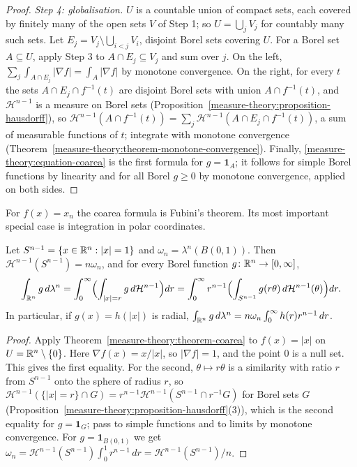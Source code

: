 \begin{proof}
\emph{Step 4: globalisation.} $U$ is a countable union of compact sets, each covered by finitely many of the open sets $V$ of Step 1; so $U = \bigcup_jV_j$ for countably many such sets. Let
$E_j = V_j \setminus \bigcup_{i < j}V_i$, disjoint Borel sets covering $U$. For a Borel set $A \subseteq U$, apply Step 3 to $A \cap E_j \subseteq V_j$ and sum over $j$. On the left,
$\sum_j\int_{A \cap E_j}|\nabla f| = \int_A|\nabla f|$ by monotone convergence. On the right, for every $t$ the sets $A \cap E_j \cap f^{-1}(t)$ are disjoint Borel sets with union
$A \cap f^{-1}(t)$, and $\mathcal{H}^{n-1}$ is a measure on Borel sets (Proposition~\ref{measure-theory:proposition-hausdorff}), so
$\mathcal{H}^{n-1}(A \cap f^{-1}(t)) = \sum_j\mathcal{H}^{n-1}(A \cap E_j \cap f^{-1}(t))$, a sum of measurable functions of $t$; integrate with monotone convergence
(Theorem~\ref{measure-theory:theorem-monotone-convergence}). Finally, \eqref{measure-theory:equation-coarea} is the first formula for $g = \mathbf{1}_A$; it follows for simple Borel functions by
linearity and for all Borel $g \geq 0$ by monotone convergence, applied on both sides.
\end{proof}

For $f(x) = x_n$ the coarea formula is Fubini's theorem. Its most important special case is integration in polar coordinates.

\begin{corollary}\label{measure-theory:corollary-polar}
Let $S^{n-1} = \{x \in \mathbb{R}^n : |x| = 1\}$ and $\omega_n = \lambda^n(B(0, 1))$. Then $\mathcal{H}^{n-1}(S^{n-1}) = n\omega_n$, and for every Borel function $g \colon \mathbb{R}^n \to [0, \infty]$,
\[
\int_{\mathbb{R}^n}g\,d\lambda^n = \int_0^\infty\Bigl(\int_{|x| = r}g\,d\mathcal{H}^{n-1}\Bigr)dr = \int_0^\infty r^{n-1}\Bigl(\int_{S^{n-1}}g(r\theta)\,d\mathcal{H}^{n-1}(\theta)\Bigr)dr .
\]
In particular, if $g(x) = h(|x|)$ is radial, $\int_{\mathbb{R}^n}g\,d\lambda^n = n\omega_n\int_0^\infty h(r)r^{n-1}\,dr$.
\end{corollary}

\begin{proof}
Apply Theorem~\ref{measure-theory:theorem-coarea} to $f(x) = |x|$ on $U = \mathbb{R}^n \setminus \{0\}$. Here $\nabla f(x) = x/|x|$, so $|\nabla f| = 1$, and the point $0$ is a null set. This gives the
first equality. For the second, $\theta \mapsto r\theta$ is a similarity with ratio $r$ from $S^{n-1}$ onto the sphere of radius $r$, so
$\mathcal{H}^{n-1}(\{|x| = r\} \cap G) = r^{n-1}\mathcal{H}^{n-1}(S^{n-1} \cap r^{-1}G)$ for Borel sets $G$ (Proposition~\ref{measure-theory:proposition-hausdorff}(3)), which is the second equality for
$g = \mathbf{1}_G$; pass to simple functions and to limits by monotone convergence. For $g = \mathbf{1}_{B(0, 1)}$ we get $\omega_n = \mathcal{H}^{n-1}(S^{n-1})\int_0^1r^{n-1}\,dr = \mathcal{H}^{n-1}(S^{n-1})/n$.
\end{proof}

